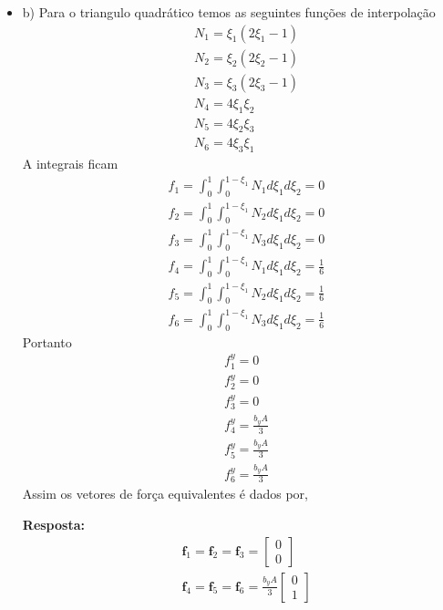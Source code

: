 \begin{itemize}
	\item b)
	Para o triangulo quadrático temos as seguintes funções de interpolação
	\begin{equation}
		\begin{split}
			&N_1 = \xi_1(2\xi_1 - 1)\\ 
			&N_2 = \xi_2(2\xi_2 - 1)\\ 
			&N_3 = \xi_3(2\xi_3 - 1)\\ 
			&N_4 = 4 \xi_1 \xi_2\\ 
			&N_5 = 4 \xi_2 \xi_3\\ 
			&N_6 = 4 \xi_3 \xi_1 
		\end{split}
	\end{equation}
	A integrais ficam
	\begin{equation}
		\begin{split}
			&f_1 = \int_{0}^{1} \int_{0}^{1-\xi_1}  N_1 d \xi_1 d \xi_2 = 0\\ 
			&f_2 = \int_{0}^{1} \int_{0}^{1-\xi_1}  N_2 d \xi_1 d \xi_2 = 0\\ 
			&f_3 = \int_{0}^{1} \int_{0}^{1-\xi_1}  N_3 d \xi_1 d \xi_2 = 0\\ 
			&f_4 = \int_{0}^{1} \int_{0}^{1-\xi_1}  N_1 d \xi_1 d \xi_2 = \frac{1}{6}\\ 
			&f_5 = \int_{0}^{1} \int_{0}^{1-\xi_1}  N_2 d \xi_1 d \xi_2 = \frac{1}{6}\\ 
			&f_6 = \int_{0}^{1} \int_{0}^{1-\xi_1}  N_3 d \xi_1 d \xi_2 = \frac{1}{6} 
		\end{split}
	\end{equation}
	Portanto
	\begin{equation}
	\begin{split}
		&f_1^y = 0\\ 
		&f_2^y = 0\\ 
		&f_3^y = 0\\
		&f_4^y = \frac{b_y A}{3}\\ 
		&f_5^y = \frac{b_y A}{3}\\ 
		&f_6^y = \frac{b_y A}{3}  
	\end{split}
	\end{equation}
	Assim os vetores de força equivalentes é dados por,

	\color{blue}
	\textbf{Resposta:}
	\begin{equation}
	\begin{split}
		&\mathbf{f}_1 = \mathbf{f}_2 = \mathbf{f}_3 =
		\begin{bmatrix}
			0\\
			0
		\end{bmatrix}\\
		&\mathbf{f}_4 = \mathbf{f}_5 = \mathbf{f}_6  
		=
		\frac{b_y A}{3}
		\begin{bmatrix}
			0\\
			1
		\end{bmatrix}
		\end{split}
	\end{equation}
	\color{black}
%
%
\end{itemize}


